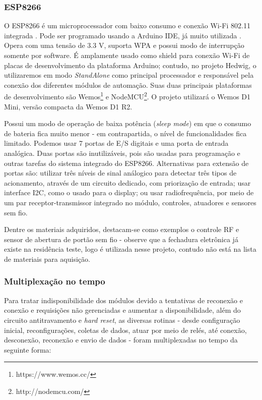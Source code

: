 \subsubsection{ESP8266}
O ESP8266 é um microprocessador com baixo consumo e conexão Wi-Fi 802.11 integrada \cite{espressif}. Pode ser programado usando a Arduino IDE, já muito utilizada \cite{thomsen}. Opera com uma tensão de 3.3 V, suporta WPA e possui modo de interrupção somente por software. É amplamente usado como shield para conexão Wi-Fi de placas de desenvolvimento da plataforma Arduino; contudo, no projeto Hedwig, o utilizaremos em modo \textit{StandAlone} como principal processador e responsável pela conexão dos diferentes módulos de automação. Suas duas principais plataformas de desenvolvimento são Wemos\footnote{https://www.wemos.cc/} e NodeMCU\footnote{http://nodemcu.com/}. O projeto utilizará o Wemos D1 Mini, versão compacta da Wemos D1 R2.

Possui um modo de operação de baixa potência (\textit{sleep mode}) em que o consumo de bateria fica muito menor - em contrapartida, o nível de funcionalidades fica limitado. Podemos usar 7 portas de E/S digitais e uma porta de entrada analógica. Duas portas são inutilizáveis, pois são usadas para programação e outras tarefas do sistema integrado do ESP8266. Alternativas para extensão de portas são: utilizar três níveis de sinal análogico para detectar três tipos de acionamento, através de um circuito dedicado, com priorização de entrada; usar interface I2C, como o usado para o display; ou usar radiofrequência, por meio de um par receptor-transmissor integrado no módulo, controles, atuadores e sensores sem fio.

Dentre os materiais adquiridos, destacam-se como exemplos o controle RF e sensor de abertura de portão sem fio - observe que a fechadura eletrônica já existe na residência teste, logo é utilizada nesse projeto, contudo não está na lista de materiais para aquisição.

\subsubsection{Multiplexação no tempo}
Para tratar indisponibilidade dos módulos devido a tentativas de reconexão e conexão e requisições não gerenciadas e aumentar a disponibilidade, além do circuito antitravamento e \textit{hard reset}, as diversas rotinas - desde configuração inicial, reconfigurações, coletas de dados, atuar por meio de relés, até conexão, desconexão, reconexão e envio de dados - foram multiplexadas no tempo da seguinte forma:

